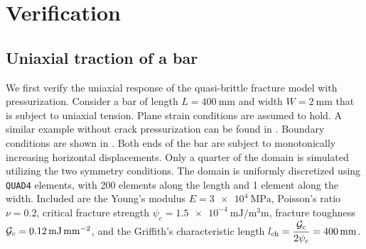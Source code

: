 \section{Verification}
\label{section: Chapter3/verification}

\subsection{Uniaxial traction of a bar}
\label{section: Chapter3/verification/bar}

We first verify the uniaxial response of the quasi-brittle fracture model with pressurization. Consider a bar of length $L = \SI{400}{\milli\meter}$ and width $W = \SI{2}{\milli\meter}$ that is subject to uniaxial tension. Plane strain conditions are assumed to hold. A similar example without crack pressurization can be found in \cite{JYWu2017}. Boundary conditions are shown in . Both ends of the bar are subject to monotonically increasing horizontal displacements. Only a quarter of the domain is simulated utilizing the two symmetry conditions. The domain is uniformly discretized using \texttt{QUAD4} elements, with 200 elements along the length and 1 element along the width. Included are the Young's modulus $E = \SI{3e4}{\mega\pascal}$, Poisson's ratio $\nu = 0.2$, critical fracture strength $\psi_c = \SI{1.5e-4}{\milli\joule\per\cubic\milli\meter}$, fracture toughness ${\mathcal{G}_c} = \SI{0.12}{\milli\joule\per\square\milli\meter}$, and the Griffith’s characteristic length $l_\text{ch} = \dfrac{{\mathcal{G}_c}}{2\psi_c} = \SI{400}{\milli\meter}$.

